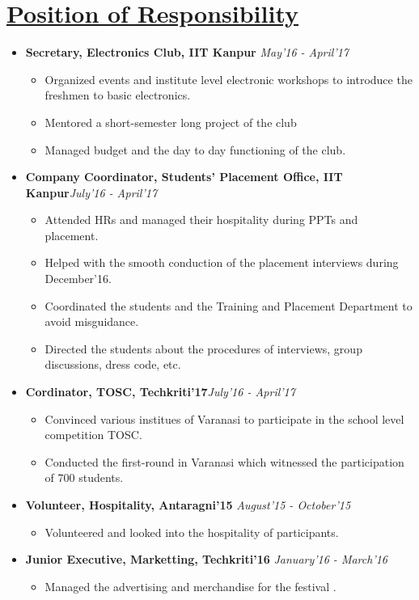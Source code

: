 \documentclass{article}
\begin{document}
\section*{\underline{Position of Responsibility}}
\begin{itemize}
\item \textbf{Secretary, Electronics Club, IIT Kanpur} \hfill\textit{May'16 - April'17}
\begin{itemize}
\item Organized events and institute level electronic workshops to introduce the freshmen  to basic electronics. 
\item Mentored a short-semester long project of the club
\item Managed budget and the day to day functioning of the club.
\end{itemize}
\item \textbf{Company Coordinator, Students' Placement Office, IIT Kanpur}\hfill\textit{July'16 - April'17}
\begin{itemize}
\item Attended HRs and managed their hospitality during PPTs and placement.
\item Helped with the smooth conduction of the placement interviews during December'16.
\item Coordinated the students and the Training and Placement Department to avoid misguidance.
\item Directed the students about the procedures of interviews, group discussions, dress code, etc.
\end{itemize}
\item \textbf{Cordinator, TOSC, Techkriti'17}\hfill\textit{July'16 - April'17}
\begin{itemize}
\item Convinced various institues of Varanasi to participate in the school level competition TOSC.
\item Conducted the first-round in Varanasi which witnessed the participation of 700 students.
\end{itemize}
\item \textbf{Volunteer, Hospitality, Antaragni'15} \hfill\textit{August'15 - October'15}
\begin{itemize}
\item Volunteered and looked into the hospitality of participants.
\end{itemize}
\item \textbf{Junior Executive, Marketting, Techkriti'16} \hfill\textit{January'16 - March'16}
\begin{itemize}
\item Managed the advertising and merchandise for the festival . 
\end{itemize}
\end{itemize}
\end{document}

